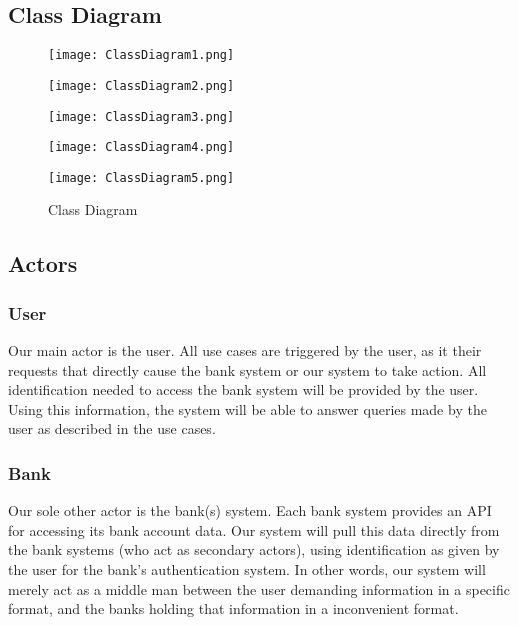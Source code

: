 \documentclass[11pt]{article}
\newcounter{use case ID}
\newcounter{req ID}
\begin{document}
\subsection{Class Diagram}

\begin{figure}[H]
\texttt{[image: ClassDiagram1.png]}
\end{figure}

\begin{figure}[H]
\texttt{[image: ClassDiagram2.png]}
\end{figure}

\begin{figure}[H]
\texttt{[image: ClassDiagram3.png]}
\end{figure}

\begin{figure}[H]
\texttt{[image: ClassDiagram4.png]}
\end{figure}

\begin{figure}[H]
\texttt{[image: ClassDiagram5.png]}
\caption{Class Diagram}
\label{fig:class-diagram}
\end{figure}

\subsection{Actors}
\subsubsection{User}
Our main actor is the user. All use cases are triggered by the user, as it their requests that directly cause the bank system or our system to take action. All identification needed to access the bank system will be provided by the user. Using this information, the system will be able to answer queries made by the user as described in the use cases.
\subsubsection{Bank}
Our sole other actor is the bank(s) system. Each bank system provides an API for accessing its bank account data. Our system will pull this data directly from the bank systems (who act as secondary actors), using identification as given by the user for the bank's authentication system. In other words, our system will merely act as a middle man between the user demanding information in a specific format, and the banks holding that information in a inconvenient format.
\end{document}
